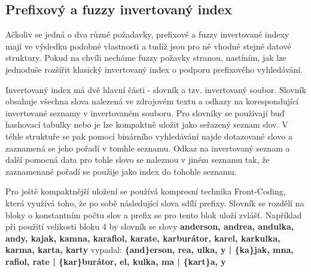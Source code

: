 \documentclass[11pt]{article}
\begin{document}
\subsection{Prefixový a fuzzy invertovaný index}
Ačkoliv se jedná o dva různé požadavky, prefixové a fuzzy invertované indexy
mají ve výsledku podobné vlastnosti a tudíž jsou pro ně vhodné stejné datové
struktury. Pokud na chvíli necháme fuzzy požavky stranou, nastíním, jak lze
jednoduše rozšířit klasický invertovaný index o podporu prefixového
vyhledávání.

Invertovaný index má dvě hlavní části - slovník a tzv. invertovaný soubor.
Slovník obsahuje všechna slova nalezená ve zdrojovém textu a odkazy na
korespondující invertované seznamy v invertovaném souboru. Pro slovníky se
používají buď hashovací tabulky nebo je lze kompaktně uložit jako seřazený
seznam slov. V téhle struktuře se pak pomocí binárního vyhledávání najde
dotazované slovo a zaznamená se jeho pořadí v tomhle seznamu. Odkaz na
invertovaný seznam a další pomocná data pro tohle slovo se naleznou v jiném
seznamu tak, že zaznamenané pořadí se použije jako index do tohohle seznamu.

%

Pro ještě kompaktnější uložení se používá kompresní technika Front-Coding,
která využívá toho, že po sobě následující slova sdílí prefixy. Slovník se
rozdělí na bloky o konstantním počtu slov a prefix se pro tento blok uloží
zvlášť. Například při použití velikosti bloku 4 by slovník se slovy
\textbf{anderson, andrea, andulka, andy, kajak, kamna, karafiol, karate,
karburátor, karel, karkulka, karma, karta, karty} vypadal:
\textbf{\{and\}erson, rea, ulka, y | \{ka\}jak, mna, rafiol, rate | \{kar\}burátor, el, kulka, ma | \{kart\}a, y}
\end{document}
